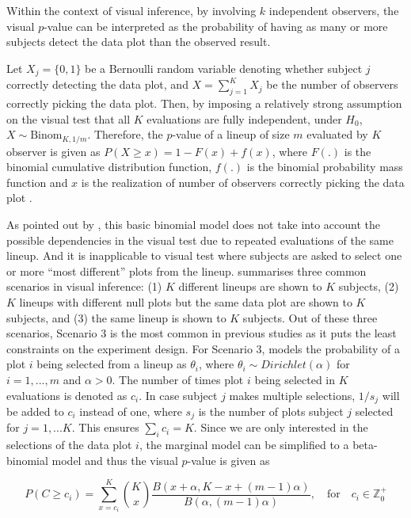 \documentclass[]{interact}
\theoremstyle{plain}%
\theoremstyle{definition}
\theoremstyle{remark}
\begin{document}
Within the context of visual inference, by involving \(k\) independent
observers, the visual \(p\)-value can be interpreted as the probability
of having as many or more subjects detect the data plot than the
observed result.

Let \(X_j = \{0,1\}\) be a Bernoulli random variable denoting whether
subject \(j\) correctly detecting the data plot, and
\(X = \sum_{j=1}^{K}X_j\) be the number of observers correctly picking
the data plot. Then, by imposing a relatively strong assumption on the
visual test that all \(K\) evaluations are fully independent, under
\(H_0\), \(X \sim \mathrm{Binom}_{K,1/m}\). Therefore, the \(p\)-value
of a lineup of size \(m\) evaluated by \(K\) observer is given as
\(P(X \geq x) = 1 - F(x) + f(x)\), where \(F(.)\) is the binomial
cumulative distribution function, \(f(.)\) is the binomial probability
mass function and \(x\) is the realization of number of observers
correctly picking the data plot \citep{majumder_validation_2013}.

As pointed out by \citet{vanderplas2021statistical}, this basic binomial
model does not take into account the possible dependencies in the visual
test due to repeated evaluations of the same lineup. And it is
inapplicable to visual test where subjects are asked to select one or
more ``most different'' plots from the lineup.
\citet{vanderplas2021statistical} summarises three common scenarios in
visual inference: (1) \(K\) different lineups are shown to \(K\)
subjects, (2) \(K\) lineups with different null plots but the same data
plot are shown to \(K\) subjects, and (3) the same lineup is shown to
\(K\) subjects. Out of these three scenarios, Scenario 3 is the most
common in previous studies as it puts the least constraints on the
experiment design. For Scenario 3, \citet{vanderplas2021statistical}
models the probability of a plot \(i\) being selected from a lineup as
\(\theta_i\), where \(\theta_i \sim Dirichlet(\alpha)\) for
\(i=1,...,m\) and \(\alpha > 0\). The number of times plot \(i\) being
selected in \(K\) evaluations is denoted as \(c_i\). In case subject
\(j\) makes multiple selections, \(1/s_j\) will be added to \(c_i\)
instead of one, where \(s_j\) is the number of plots subject \(j\)
selected for \(j=1,...K\). This ensures \(\sum_{i}c_i=K\). Since we are
only interested in the selections of the data plot \(i\), the marginal
model can be simplified to a beta-binomial model and thus the visual
\(p\)-value is given as

\begin{equation} \label{eq:pvalue-beta-binomial}
P(C \geq c_i) = \sum_{x=c_i}^{K}{K \choose x}\frac{B(x + \alpha, K - x + (m - 1)\alpha)}{B(\alpha, (m-1)\alpha)},\quad \text{for} \quad c_i \in \mathbb{Z}_0^+
\end{equation}
\end{document}
